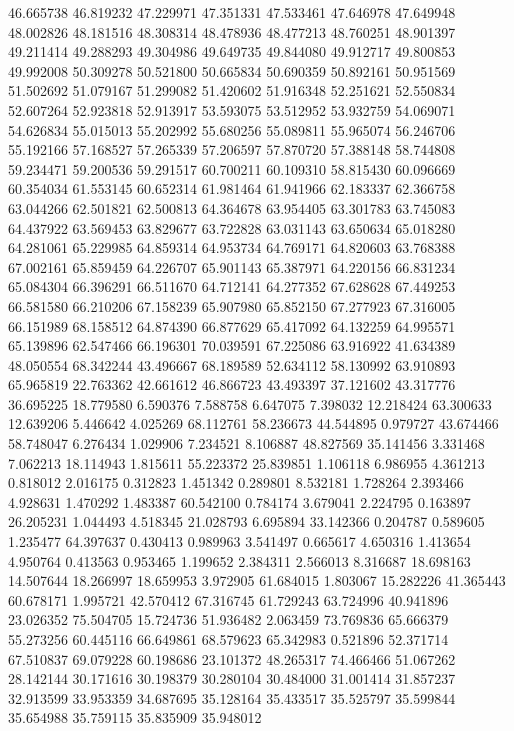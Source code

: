 46.665738
46.819232
47.229971
47.351331
47.533461
47.646978
47.649948
48.002826
48.181516
48.308314
48.478936
48.477213
48.760251
48.901397
49.211414
49.288293
49.304986
49.649735
49.844080
49.912717
49.800853
49.992008
50.309278
50.521800
50.665834
50.690359
50.892161
50.951569
51.502692
51.079167
51.299082
51.420602
51.916348
52.251621
52.550834
52.607264
52.923818
52.913917
53.593075
53.512952
53.932759
54.069071
54.626834
55.015013
55.202992
55.680256
55.089811
55.965074
56.246706
55.192166
57.168527
57.265339
57.206597
57.870720
57.388148
58.744808
59.234471
59.200536
59.291517
60.700211
60.109310
58.815430
60.096669
60.354034
61.553145
60.652314
61.981464
61.941966
62.183337
62.366758
63.044266
62.501821
62.500813
64.364678
63.954405
63.301783
63.745083
64.437922
63.569453
63.829677
63.722828
63.031143
63.650634
65.018280
64.281061
65.229985
64.859314
64.953734
64.769171
64.820603
63.768388
67.002161
65.859459
64.226707
65.901143
65.387971
64.220156
66.831234
65.084304
66.396291
66.511670
64.712141
64.277352
67.628628
67.449253
66.581580
66.210206
67.158239
65.907980
65.852150
67.277923
67.316005
66.151989
68.158512
64.874390
66.877629
65.417092
64.132259
64.995571
65.139896
62.547466
66.196301
70.039591
67.225086
63.916922
41.634389
48.050554
68.342244
43.496667
68.189589
52.634112
58.130992
63.910893
65.965819
22.763362
42.661612
46.866723
43.493397
37.121602
43.317776
36.695225
18.779580
6.590376
7.588758
6.647075
7.398032
12.218424
63.300633
12.639206
5.446642
4.025269
68.112761
58.236673
44.544895
0.979727
43.674466
58.748047
6.276434
1.029906
7.234521
8.106887
48.827569
35.141456
3.331468
7.062213
18.114943
1.815611
55.223372
25.839851
1.106118
6.986955
4.361213
0.818012
2.016175
0.312823
1.451342
0.289801
8.532181
1.728264
2.393466
4.928631
1.470292
1.483387
60.542100
0.784174
3.679041
2.224795
0.163897
26.205231
1.044493
4.518345
21.028793
6.695894
33.142366
0.204787
0.589605
1.235477
64.397637
0.430413
0.989963
3.541497
0.665617
4.650316
1.413654
4.950764
0.413563
0.953465
1.199652
2.384311
2.566013
8.316687
18.698163
14.507644
18.266997
18.659953
3.972905
61.684015
1.803067
15.282226
41.365443
60.678171
1.995721
42.570412
67.316745
61.729243
63.724996
40.941896
23.026352
75.504705
15.724736
51.936482
2.063459
73.769836
65.666379
55.273256
60.445116
66.649861
68.579623
65.342983
0.521896
52.371714
67.510837
69.079228
60.198686
23.101372
48.265317
74.466466
51.067262
28.142144
30.171616
30.198379
30.280104
30.484000
31.001414
31.857237
32.913599
33.953359
34.687695
35.128164
35.433517
35.525797
35.599844
35.654988
35.759115
35.835909
35.948012
